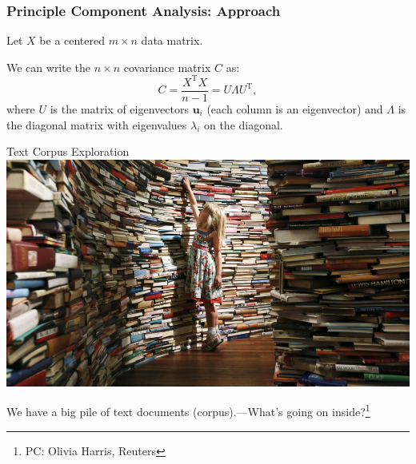 \documentclass[compress,mathserif,t]{beamer} %
\begin{document}
\begin{frame}
	\frametitle{Principle Component Analysis: Approach}
	
	Let $X$ be a centered $m \times n$ data matrix.  
	
	\vspace{.4cm}
	We can write the $n \times n$ 
	covariance matrix $C$ as:
	\[ C = \frac{X^\text{T} X}{n - 1} = 
	U \Lambda U^\text{T}, \] 
	where $U$ is the matrix of 
	eigenvectors $\mathbf{u}_i$ 
	(each 
	column is an 
	eigenvector) and $\Lambda$ 
	is the diagonal matrix with eigenvalues 
	$\lambda_i$ on the diagonal. 
	
	\vspace{.4cm} 
	
\end{frame}





\begin{frame}{Text Corpus Exploration}
\includegraphics[width=.8\textwidth]{books-olivia-harris-reuters}

\vspace{1cm}

We have a big pile of text documents 
(corpus).---What's 
going on inside?\footnote{PC: Olivia Harris,  
Reuters} 
\end{frame}
\end{document}
